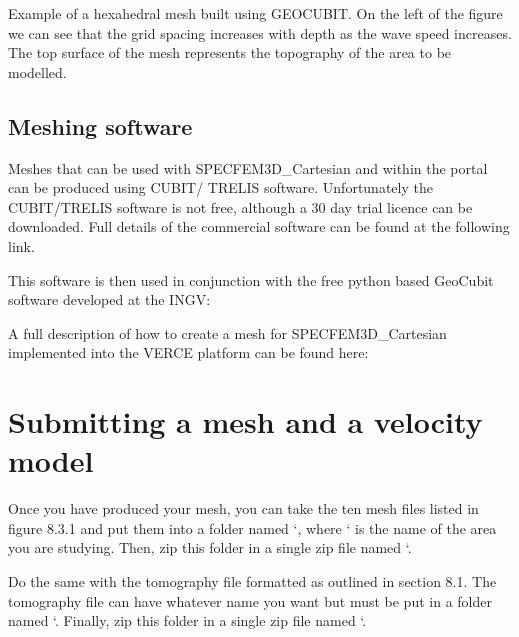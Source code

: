 \documentclass[english]{book}
\begin{document}

 Example of a hexahedral mesh built using GEOCUBIT. On
the left of the figure we can see that the grid spacing increases with
depth as the wave speed increases. The top surface of the mesh
represents the topography of the area to be modelled.


\subsection{Meshing software}
\label{\detokenize{Section8:meshing-software}}
Meshes that can be used with SPECFEM3D\_Cartesian and within the portal
can be produced using CUBIT/ TRELIS software. Unfortunately the
CUBIT/TRELIS software is not free, although a 30 day trial licence can
be downloaded. Full details of the commercial software can be found at
the following link.


This software is then used in conjunction with the free python based
GeoCubit software developed at the INGV:


A full description of how to create a mesh for SPECFEM3D\_Cartesian
implemented into the VERCE platform can be found here:



\section{Submitting a mesh and a velocity model}
\label{\detokenize{Section8:submitting-a-mesh-and-a-velocity-model}}
Once you have produced your mesh, you can take the ten mesh files listed
in figure 8.3.1 and put them into a folder named
‘, where ‘ is the name
of the area you are studying. Then, zip this folder in a single zip file
named ‘.

Do the same with the tomography file formatted as outlined in section
8.1. The tomography file can have whatever name you want but must be put
in a folder named ‘. Finally, zip this
folder in a single zip file named ‘.
\end{document}
